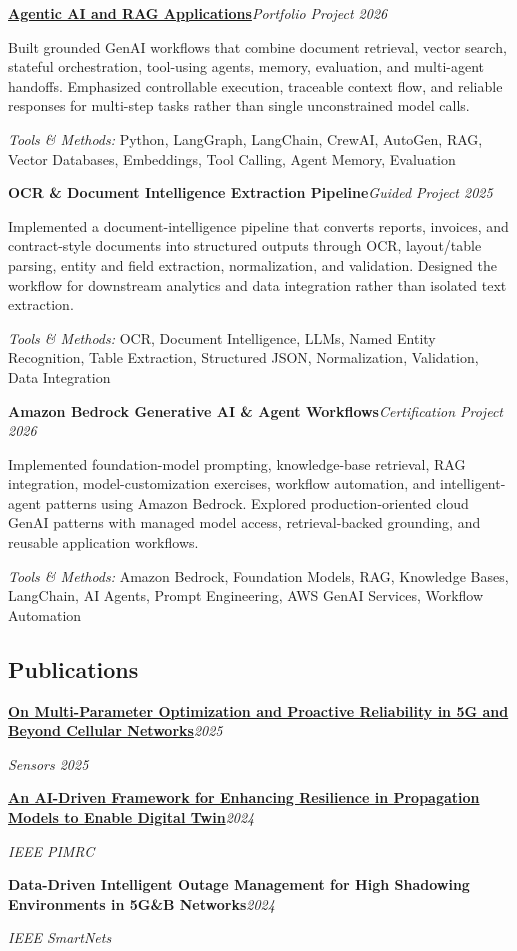 \documentclass[9pt,letterpaper]{extarticle}
\newcommand{\entry}[2]{\Needspace{4\baselineskip}\textbf{#1}\hfill\textit{#2}\par}
\begin{document}
\entry{\href{https://github.com/WaseemRaza844/agentic-ai-projects-by-was}{Agentic AI and RAG Applications}}{Portfolio Project \textbar{} 2026}
Built grounded GenAI workflows that combine document retrieval, vector search, stateful orchestration, tool-using agents, memory, evaluation, and multi-agent handoffs. Emphasized controllable execution, traceable context flow, and reliable responses for multi-step tasks rather than single unconstrained model calls.\par
{\small\textit{Tools \& Methods:} Python, LangGraph, LangChain, CrewAI, AutoGen, RAG, Vector Databases, Embeddings, Tool Calling, Agent Memory, Evaluation\par}
\vspace{1pt}
\entry{OCR \& Document Intelligence Extraction Pipeline}{Guided Project \textbar{} 2025}
Implemented a document-intelligence pipeline that converts reports, invoices, and contract-style documents into structured outputs through OCR, layout/table parsing, entity and field extraction, normalization, and validation. Designed the workflow for downstream analytics and data integration rather than isolated text extraction.\par
{\small\textit{Tools \& Methods:} OCR, Document Intelligence, LLMs, Named Entity Recognition, Table Extraction, Structured JSON, Normalization, Validation, Data Integration\par}
\vspace{1pt}
\entry{Amazon Bedrock Generative AI \& Agent Workflows}{Certification Project \textbar{} 2026}
Implemented foundation-model prompting, knowledge-base retrieval, RAG integration, model-customization exercises, workflow automation, and intelligent-agent patterns using Amazon Bedrock. Explored production-oriented cloud GenAI patterns with managed model access, retrieval-backed grounding, and reusable application workflows.\par
{\small\textit{Tools \& Methods:} Amazon Bedrock, Foundation Models, RAG, Knowledge Bases, LangChain, AI Agents, Prompt Engineering, AWS GenAI Services, Workflow Automation\par}
\vspace{1pt}
\subsection{Publications}
\entry{\href{https://doi.org/10.3390/s25247651}{On Multi-Parameter Optimization and Proactive Reliability in 5G and Beyond Cellular Networks}}{2025}
\textit{Sensors 2025}\par
\entry{\href{https://doi.org/10.1109/PIMRC59610.2024.10817403}{An AI-Driven Framework for Enhancing Resilience in Propagation Models to Enable Digital Twin}}{2024}
\textit{IEEE PIMRC}\par
\entry{Data-Driven Intelligent Outage Management for High Shadowing Environments in 5G\&B Networks}{2024}
\textit{IEEE SmartNets}\par
{}
\end{document}
